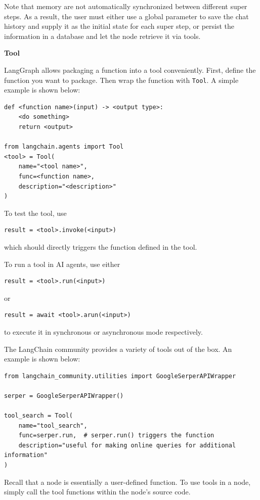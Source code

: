 Note that memory are not automatically synchronized between different super steps. As a result, the user must either use a global parameter to save the chat history and supply it as the initial state for each super step, or persist the information in a database and let the node retrieve it via tools.

\vspace{0.1in}
\noindent \textbf{Tool}
\vspace{0.1in}

LangGraph allows packaging a function into a tool conveniently. First, define the function you want to package. Then wrap the function with \verb|Tool|. A simple example is shown below:
\begin{lstlisting}
def <function name>(input) -> <output type>:
    <do something>
    return <output>

from langchain.agents import Tool
<tool> = Tool(
    name="<tool name>",
    func=<function name>,
    description="<description>"
)
\end{lstlisting}

To test the tool, use
\begin{lstlisting}
result = <tool>.invoke(<input>)
\end{lstlisting}
which should directly triggers the function defined in the tool.

To run a tool in AI agents, use either
\begin{lstlisting}
result = <tool>.run(<input>)
\end{lstlisting}
or
\begin{lstlisting}
result = await <tool>.arun(<input>)
\end{lstlisting}
to execute it in synchronous or asynchronous mode respectively.

The LangChain community provides a variety of tools out of the box. An example is shown below:
\begin{lstlisting}
from langchain_community.utilities import GoogleSerperAPIWrapper

serper = GoogleSerperAPIWrapper()

tool_search = Tool(
    name="tool_search",
    func=serper.run,  # serper.run() triggers the function
    description="useful for making online queries for additional information"
)
\end{lstlisting}

Recall that a node is essentially a user-defined function. To use tools in a node, simply call the tool functions within the node’s source code.


